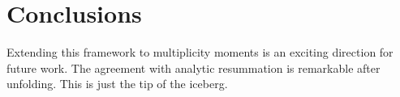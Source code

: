 \section{Conclusions}\label{sec:conclusions}

Extending this framework to multiplicity moments is an exciting
direction for future work. The agreement with analytic resummation is
remarkable after unfolding. This is just the tip of the iceberg.

